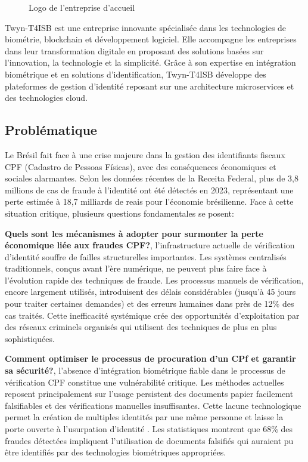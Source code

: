 
\begin{figure}[H]
\centering
{} %
\caption{Logo de l'entreprise d'accueil }
\label{fig:1-1-company-logo}
\end{figure}

Twyn-T4ISB est une entreprise innovante spécialisée dans les technologies de biométrie, blockchain et développement logiciel. Elle accompagne les entreprises dans leur transformation digitale en proposant des solutions basées sur l'innovation, la technologie et la simplicité. Grâce à son expertise en intégration biométrique et en solutions d'identification, Twyn-T4ISB développe des plateformes de gestion d'identité reposant sur une architecture microservices et des technologies cloud.\\



\subsection{Problématique}
Le Brésil fait face à une crise majeure dans la gestion des identifiants fiscaux CPF (Cadastro de Pessoas Físicas), avec des conséquences économiques et sociales alarmantes. Selon les données récentes de la Receita Federal, plus de 3,8 millions de cas de fraude à l'identité ont été détectés en 2023, représentant une perte estimée à 18,7 milliards de reais pour l'économie brésilienne. Face à cette situation critique, plusieurs questions fondamentales se posent:

\textbf{Quels sont les mécanismes à adopter pour surmonter la perte économique liée aux fraudes CPF?}, l'infrastructure actuelle de vérification d'identité souffre de failles structurelles importantes. Les systèmes centralisés traditionnels, conçus avant l'ère numérique, ne peuvent plus faire face à l'évolution rapide des techniques de fraude. Les processus manuels de vérification, encore largement utilisés, introduisent des délais considérables (jusqu'à 45 jours pour traiter certaines demandes) et des erreurs humaines dans près de 12\% des cas traités. Cette inefficacité systémique crée des opportunités d'exploitation par des réseaux criminels organisés qui utilisent des techniques de plus en plus sophistiquées.

\textbf{Comment optimiser le processus de procuration d'un CPf et garantir sa sécurité?}, l'absence d'intégration biométrique fiable dans le processus de vérification CPF constitue une vulnérabilité critique. Les méthodes actuelles reposent principalement sur l'usage persistent des documents papier facilement falsifiables et des vérifications manuelles insuffisantes. Cette lacune technologique permet la création de multiples identités par une même personne et laisse la porte ouverte à l'usurpation d'identité . Les statistiques montrent que 68\% des fraudes détectées impliquent l'utilisation de documents falsifiés qui auraient pu être identifiés par des technologies biométriques appropriées.

